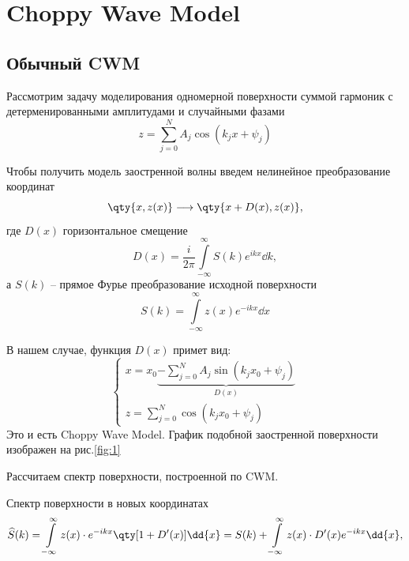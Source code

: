 \documentclass[a4paper,14pt]{extarticle}
\begin{document}
\section{Choppy Wave Model}
\subsection{Обычный CWM}%

Рассмотрим задачу моделирования одномерной поверхности суммой гармоник 
 с детерменированными амплитудами и случайными фазами
 \begin{equation}
     \label{eq:}
     z = \sum\limits_{j=0}^{N} A_j \cos(k_j x + \psi_j)
 \end{equation}

Чтобы получить модель заостренной волны введем нелинейное преобразование координат
\begin{equation}
    \label{eq:}
    \qty{x,z(x)} \longrightarrow \qty{x + D(x),z(x)},
\end{equation}
где $D(x)$ горизонтальное смещение
\begin{equation}
    \label{eq:}
    D(x) =  \frac{i}{2\pi} \int\limits_{-\infty}^{\infty}   S(k) e^{ikx} \dd{k},
\end{equation}
а $S(k)$ -- прямое Фурье преобразование исходной поверхности
\begin{equation}
    \label{eq:}
    S(k) = \int\limits_{-\infty}^{\infty} z(x) e^{-ikx} \dd x 
\end{equation}

В нашем случае, функция $D(x)$ примет вид: 
\begin{equation}
    \label{eq:}
    \begin{cases}
    x = x_{0} \underbrace{
    - \sum\limits_{j=0}^{N} A_j \sin(k_j x_0 + \psi_j)
    }_{D(x)} \\
        z = \sum\limits_{j=0}^{N} \cos(k_j x_{0} + \psi_j)
    \end{cases}
\end{equation}
Это и есть Choppy Wave Model. График подобной заостренной поверхности 
изображен на рис.\ref{fig:1}


Рассчитаем спектр  поверхности, построенной по CWM.

 Спектр поверхности в новых координатах 
 \begin{equation}
     \label{eq:S_cwm}
     \widehat S(k) = \int\limits_{-\infty}^{\infty} z(x) \cdot  
     e^{-ikx} \qty[ 1 + D'(x)]
     \dd{x}  = S(k) + \int\limits_{-\infty}^{\infty} z(x) \cdot D'(x)  
     e^{-ikx}\dd{x},
 \end{equation}
\end{document}
